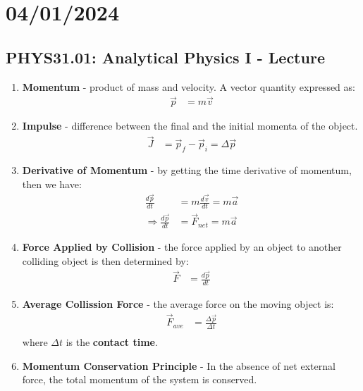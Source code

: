 \documentclass{article}
\begin{document}
\section*{04/01/2024}
\subsection*{PHYS31.01: Analytical Physics I - Lecture}
        \begin{enumerate}
            \item \textbf{Momentum}
             - product of mass and velocity. A vector quantity expressed as:
            \begin{align*}
                \vec{p}&=m\vec{v} 
            \end{align*}
            \item \textbf{Impulse}
            - difference between the final and the initial momenta of the object.
            \begin{align*}
                \vec{J}&=\vec{p}_{f}-\vec{p}_{i}=\Delta\vec{p} 
            \end{align*}
            \item \textbf{Derivative of Momentum}
            - by getting the time derivative of momentum, then we have:
            \begin{align*}
                \frac{d\vec{p}}{dt}&=m\frac{d\vec{v}}{dt}=m\vec{a} \\
                \Rightarrow\frac{d\vec{p}}{dt}&=\vec{F}_{net}=m\vec{a}
            \end{align*}
            \item \textbf{Force Applied by Collision}
            - the force applied by an object to another colliding object is then determined by:
            \begin{align*}
                \vec{F}&=\frac{d\vec{p}}{dt}
            \end{align*}
            \item \textbf{Average Collission Force}
            - the average force on the moving object is:
            \begin{align*}
                \vec{F}_{ave}&=\frac{\Delta\vec{p}}{\Delta t} \\
            \end{align*}    
            where $\Delta t$ is the \textbf{contact time}.
            \item \textbf{Momentum Conservation Principle}
            - In the absence of net external force, the total momentum of the system is conserved.

\end{enumerate}
\end{document}
